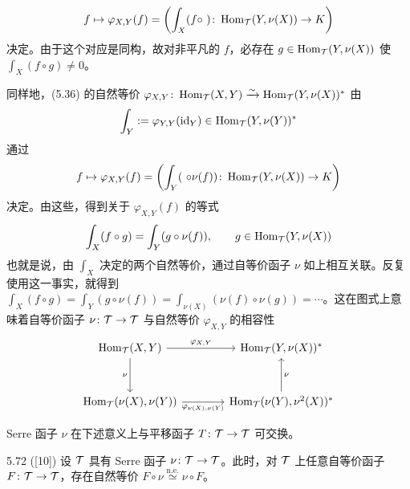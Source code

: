 \[
  f \mapsto \varphi_{X,Y}(f) = \left(\int_{X}(f\circ\ )\colon \operatorname{Hom}_{\mathcal{T}}(Y,\nu(X)) \to K\right)
\]
决定。由于这个对应是同构，故对非平凡的 $f$，必存在 $g \in \operatorname{Hom}_{\mathcal{T}}(Y,\nu(X))$ 使 $\int_{X}(f\circ g) \ne 0$。

同样地，(5.36) 的自然等价 $\varphi_{X,Y} \colon \operatorname{Hom}_{\mathcal{T}}(X,Y) \xrightarrow{\sim} \operatorname{Hom}_{\mathcal{T}}(Y,\nu(X))^{*}$ 由
\[
  \int_{Y} := \varphi_{Y,Y}(\mathrm{id}_{Y}) \in \operatorname{Hom}_{\mathcal{T}}(Y,\nu(Y))^{*}
\]
通过
\[
  f \mapsto \varphi_{X,Y}(f) = \left(\int_{Y}(\ \circ\nu(f))\colon \operatorname{Hom}_{\mathcal{T}}(Y,\nu(X)) \to K\right)
\]
决定。由这些，得到关于 $\varphi_{X,Y}(f)$ 的等式
\[
  \int_{X}(f\circ g) = \int_{Y}(g\circ\nu(f)), \qquad g \in \operatorname{Hom}_{\mathcal{T}}(Y,\nu(X))
\]
也就是说，由 $\int_{X}$ 决定的两个自然等价，通过自等价函子 $\nu$ 如上相互关联。反复使用这一事实，就得到 $\int_{X}(f\circ g) = \int_{Y}(g\circ\nu(f)) = \int_{\nu(X)}(\nu(f)\circ\nu(g)) = \cdots$。这在图式上意味着自等价函子 $\nu \colon \mathcal{T} \to \mathcal{T}$ 与自然等价 $\varphi_{X,Y}$ 的相容性
\[
\begin{tikzcd}[row sep=3em, column sep=3.8em]
  \Hom_{\cT}(X,Y) \arrow[r,"\varphi_{X,Y}"] \arrow[d,"\nu"'] & \Hom_{\cT}(Y,\nu(X))^{*}\\
  \Hom_{\cT}(\nu(X),\nu(Y)) \arrow[r,"\varphi_{\nu(X),\nu(Y)}"'] & \Hom_{\cT}(\nu(Y),\nu^{2}(X))^{*} \arrow[u,"\nu"']
\end{tikzcd}
\]



Serre 函子 $\nu$ 在下述意义上与平移函子 $T \colon \mathcal{T} \to \mathcal{T}$ 可交换。

\begin{lemma}{5.72} ([10]) 设 $\mathcal{T}$ 具有 Serre 函子 $\nu \colon \mathcal{T} \to \mathcal{T}$。此时，对 $\mathcal{T}$ 上任意自等价函子 $F \colon \mathcal{T} \to \mathcal{T}$，存在自然等价 $F\circ\nu \overset{\mathrm{n.e.}}{\simeq} \nu\circ F$。\end{lemma}

